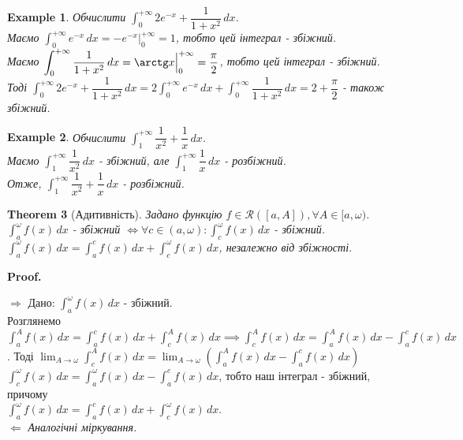 \documentclass[a4paper, 10pt]{article}
\makeatletter
\def\huge{\displaystyle}
\def\qed{$\blacksquare$}
\def\rightproof{$\boxed{\Rightarrow}$ }
\def\leftproof{$\boxed{\Leftarrow}$ }
\theoremstyle{theoremdd}
\newtheorem{theorem}{Theorem}[subsection]
\theoremstyle{theoremdd}
\theoremstyle{theoremdd}
\theoremstyle{theoremdd}
\theoremstyle{theoremdd}
\newtheorem{example}[theorem]{Example}
\theoremstyle{theoremdd}
\theoremstyle{theoremdd}
\theoremstyle{theoremdd}
\theoremstyle{theoremdd}
\renewenvironment{proof}[1][Proof.\\]{\par
\pushQED{\hfill \qed}%
\normalfont \topsep6\p@\@plus6\p@\relax
\trivlist
\item\relax
{\bfseries
#1\@addpunct{.}}\hspace\labelsep\ignorespaces
}{%
\popQED\endtrivlist\@endpefalse
}
\makeatother
\begin{document}
\begin{example}
Обчислити $\huge\int_0^{+\infty} 2e^{-x} + \dfrac{1}{1+x^2}\,dx$.\\
Маємо $\huge\int_0^{+\infty} e^{-x}\,dx = -e^{-x} \Big|_0^{+\infty} = 1$, тобто цей інтеграл - збіжний.\\
Маємо $\huge\int_0^{+\infty} \dfrac{1}{1+x^2}\,dx = \arctg x \Big|_0^{+\infty} = \dfrac{\pi}{2}$, тобто цей інтеграл - збіжний.\\
Тоді $\huge\int_0^{+\infty} 2e^{-x} + \dfrac{1}{1+x^2}\,dx = 2 \int_0^{+\infty} e^{-x}\,dx + \int_0^{+\infty} \dfrac{1}{1+x^2}\,dx = 2 + \dfrac{\pi}{2}$ - також збіжний.
\end{example}

\begin{example}
Обчислити $\displaystyle\int_1^{+\infty} \dfrac{1}{x^2} + \dfrac{1}{x}\,dx$.\\
Маємо $\displaystyle\int_1^{+\infty} \dfrac{1}{x^2}\,dx$ - збіжний, але $\displaystyle\int_1^{+\infty} \dfrac{1}{x}\,dx$ - розбіжний.\\
Отже, $\displaystyle\int_1^{+\infty} \dfrac{1}{x^2} + \dfrac{1}{x}\,dx$ - розбіжний.
\end{example}

\begin{theorem}[Адитивність]
Задано функцію $f \in \mathcal{R}([a,A]), \forall A \in [a,\omega)$.\\
$\huge\int_a^\omega f(x)\,dx$ - збіжний $\iff \forall c \in (a,\omega): \huge\int_c^\omega f(x)\,dx$ - збіжний. \\ 
$\huge\int_a^\omega f(x)\,dx = \int_a^c f(x)\,dx + \int_c^\omega f(x)\,dx$, незалежно від збіжності.
\end{theorem}

\begin{proof}
\rightproof Дано: $\huge\int_a^\omega f(x)\,dx$ - збіжний.\\
Розглянемо $\huge\int_a^A f(x)\,dx = \int_a^c f(x)\,dx + \int_c^A f(x)\,dx \implies \int_c^A f(x)\,dx = \huge\int_a^A f(x)\,dx - \int_a^c f(x)\,dx$.
Тоді $\huge\lim_{A \to \omega} \int_c^A f(x)\,dx = \huge\lim_{A \to \omega} \left( \int_a^A f(x)\,dx - \int_a^c f(x)\,dx \right)$\\
$\huge\int_c^\omega f(x)\,dx = \int_a^\omega f(x)\,dx - \int_a^c f(x)\,dx$, тобто наш інтеграл - збіжний, причому\\
$\huge\int_a^\omega f(x)\,dx = \int_a^c f(x)\,dx + \int_c^\omega f(x)\,dx$.
\bigskip \\
\leftproof \textit{Аналогічні міркування.}
\end{proof}
\end{document}
